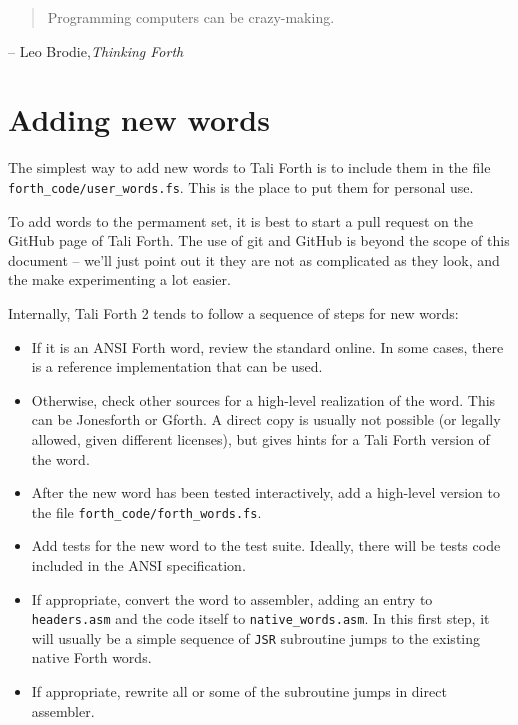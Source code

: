 
\begin{quote}
        Programming computers can be crazy-making.
\end{quote}
\begin{flushright}
        -- Leo Brodie,\textit{Thinking Forth}\cite{brodie84}
\end{flushright}



\section{Adding new words}

The simplest way to add new words to Tali Forth is to include them in the file
\texttt{forth\_code/user\_words.fs}. This is the place to put them for personal
use. 

To add words to the permament set, it is best to start a pull request on the GitHub page of Tali Forth. The use of
git and GitHub is beyond the scope of this document -- we'll just
point out it they are not as complicated as they look, and the make
experimenting a lot easier.

Internally, Tali Forth 2 tends to follow a sequence of steps for new words:
\begin{itemize}

        \item If it is an ANSI Forth word, review the standard
                online. In some cases, there is a reference implementation that
                can be used.
        \item Otherwise, check other sources for a high-level realization of the
                word. This can be Jonesforth or
                Gforth. A direct copy is usually not possible (or
                legally allowed, given different licenses), but gives hints for
                a Tali Forth version of the word.
        \item After the new word has been tested interactively, add a high-level
                version to the file \texttt{forth\_code/forth\_words.fs}. 
        \item Add tests for the new word to the test suite. Ideally, there will
                be tests code included in the ANSI specification.
        \item If appropriate, convert the word to assembler, adding an entry to
                \texttt{headers.asm} and the code itself to
                \texttt{native\_words.asm}. In this first step, it will usually
                be a simple sequence of \texttt{JSR} subroutine jumps to the
                existing native Forth words.
        \item If appropriate, rewrite all or some of the subroutine jumps in
                direct assembler.
\end{itemize}

